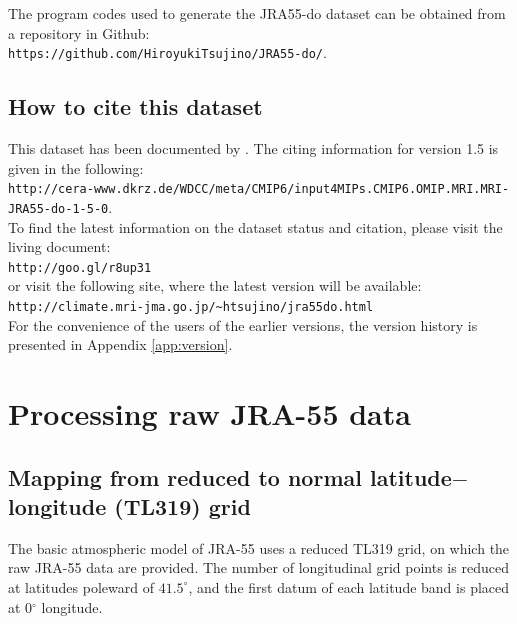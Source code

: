 \documentclass[dvipdfmx]{elsarticle_mod}
\begin{document}
The program codes used to generate the JRA55-do dataset can be obtained from a repository in Github:\\
\hspace*{3zw}\texttt{https://github.com/HiroyukiTsujino/JRA55-do/}.


\subsection{How to cite this dataset}
\label{sec:citation}

This dataset has been documented by \citet{Tsujino_et_al_2018}. The citing information for version 1.5 is given in the following:\\
\hspace*{3zw}\texttt{http://cera-www.dkrz.de/WDCC/meta/CMIP6/input4MIPs.CMIP6.OMIP.MRI.MRI-JRA55-do-1-5-0}.\\
To find the latest information on the dataset status and citation, please visit the living document:\\
\hspace{3zw}\texttt{http://goo.gl/r8up31}\\
or visit the following site, where the latest version will be available:\\
\hspace{3zw}\texttt{http://climate.mri-jma.go.jp/\~{}htsujino/jra55do.html}\\


For the convenience of the users of the earlier versions, the version history is presented in Appendix \ref{app:version}.

\appendix
\renewcommand{\thesection}{\Alph{section}}
\renewcommand{\thefigure}{\arabic{figure}}
\renewcommand{\thetable}{\arabic{table}}

\section{Processing raw JRA-55 data}
\label{app:raw-processing}

%
\subsection{Mapping from reduced to normal latitude$-$longitude (TL319) grid}
\label{app:interp}

The basic atmospheric model of JRA-55 uses a reduced TL319 grid, on which the raw JRA-55 data are provided. The number of longitudinal grid points is reduced at latitudes poleward of $41.5^{\circ}$, and the first datum of each latitude band is placed at 0$^{\circ}$ longitude.
\end{document}
